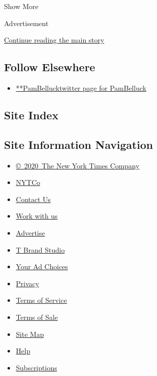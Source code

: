 Show More

Advertisement

\protect\hyperlink{after-mid2}{Continue reading the main story}

\hypertarget{follow-elsewhere}{%
\subsection{Follow Elsewhere}\label{follow-elsewhere}}

\begin{itemize}
\tightlist
\item
  \href{https://twitter.com/PamBelluck}{**PamBellucktwitter page for
  PamBelluck}
\end{itemize}

\hypertarget{site-index}{%
\subsection{Site Index}\label{site-index}}

\hypertarget{site-information-navigation}{%
\subsection{Site Information
Navigation}\label{site-information-navigation}}

\begin{itemize}
\tightlist
\item
  \href{https://help.nytimes.com/hc/en-us/articles/115014792127-Copyright-notice}{©~2020~The
  New York Times Company}
\end{itemize}

\begin{itemize}
\tightlist
\item
  \href{https://www.nytco.com/}{NYTCo}
\item
  \href{https://help.nytimes.com/hc/en-us/articles/115015385887-Contact-Us}{Contact
  Us}
\item
  \href{https://www.nytco.com/careers/}{Work with us}
\item
  \href{https://nytmediakit.com/}{Advertise}
\item
  \href{http://www.tbrandstudio.com/}{T Brand Studio}
\item
  \href{https://www.nytimes.com/privacy/cookie-policy\#how-do-i-manage-trackers}{Your
  Ad Choices}
\item
  \href{https://www.nytimes.com/privacy}{Privacy}
\item
  \href{https://help.nytimes.com/hc/en-us/articles/115014893428-Terms-of-service}{Terms
  of Service}
\item
  \href{https://help.nytimes.com/hc/en-us/articles/115014893968-Terms-of-sale}{Terms
  of Sale}
\item
  \href{https://spiderbites.nytimes.com}{Site Map}
\item
  \href{https://help.nytimes.com/hc/en-us}{Help}
\item
  \href{https://www.nytimes.com/subscription?campaignId=37WXW}{Subscriptions}
\end{itemize}
